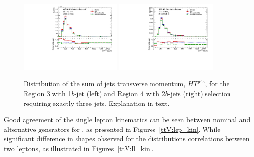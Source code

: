 \begin{figure}[!htb]
\centering
\includegraphics[width=0.45\textwidth]{Plots/ttV/c_Region_2_HT_jets}
\includegraphics[width=0.45\textwidth]{Plots/ttV/c_Region_3_HT_jets}\\
  \caption{Distribution of the sum of jets transverse momentum, $HT^{\text{jets}}$, for the Region 3 with 1$b$-jet (left) and Region 4 with 2$b$-jets (right) selection requiring exactly three jets. Explanation in text. \label{ttV:3j12b}}
\end{figure}

Good agreement of the single lepton kinematics can be seen between nominal and alternative generators for , as presented in Figures~\ref{ttV:lep_kin}.
While significant difference in shapes observed for the distributions  correlations between two leptons, as illustrated in Figures~\ref{ttV:ll_kin}.


